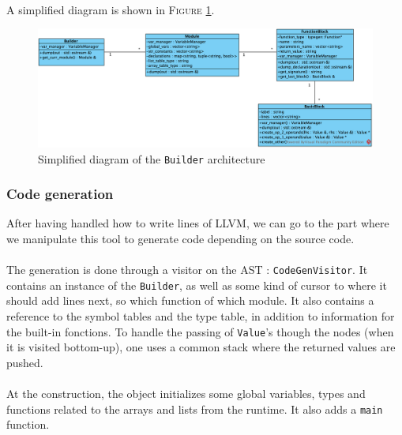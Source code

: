 \documentclass[a4paper,11pt]{article}
\begin{document}
\paragraph{}

A simplified diagram is shown in \textsc{Figure} \ref{codegen:builder}.

\begin{figure}
	\centering
	\includegraphics[scale=0.7]{Builder.png}
	\caption{Simplified diagram of the \texttt{Builder} architecture}
	\label{codegen:builder}
\end{figure}

	\subsubsection{Code generation}

After having handled how to write lines of LLVM, we can go to the part where we manipulate this tool to generate code depending on the source code.

\paragraph{}

The generation is done through a visitor on the AST : \texttt{CodeGenVisitor}. It contains an instance of the \texttt{Builder}, as well as some kind of cursor to where it should add lines next, so which function of which module. It also contains a reference to the symbol tables and the type table, in addition to information for the built-in fonctions. To handle the passing of \texttt{Value}'s though the nodes (when it is visited bottom-up), one uses a common stack where the returned values are pushed.

\paragraph{}

At the construction, the object initializes some global variables, types and functions related to the arrays and lists from the runtime. It also adds a \texttt{main} function.
\end{document}
